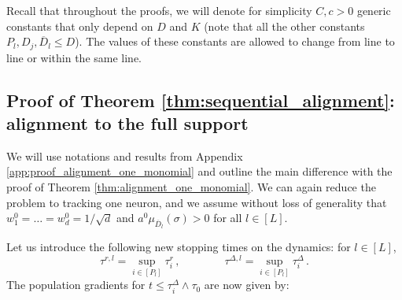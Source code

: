 \documentclass[11pt]{article}
\newcommand{\<}{\langle}
\renewcommand{\>}{\rangle}
\theoremstyle{definition}
\def\oD{\overline{D}}
\def\oD{\overline{D}}
\begin{document}
Recall that throughout the proofs, we will denote for simplicity $C,c>0$ generic constants that only depend on $D$ and $K$ (note that all the other constants $P_l,D_j,\oD_l \leq D$). The values of these constants are allowed to change from line to line or within the same line.


\subsection{Proof of Theorem \ref{thm:sequential_alignment}: alignment to the full support}\label{app:proof_theorem_2}

We will use notations and results from Appendix \ref{app:proof_alignment_one_monomial} and outline the main difference with the proof of Theorem \ref{thm:alignment_one_monomial}. We can again reduce the problem to tracking one neuron, and we assume without loss of generality that $w_1^0 = \ldots = w_d^0 = 1/\sqrt{d}$ and $a^0 \mu_{\oD_l} (\sigma ) >0$ for all $l \in [L]$. 

Let us introduce the following new stopping times on the dynamics: for $l\in [L]$,
\[
\tau^{r,l} = \sup_{i \in [P_l]} \tau_i^r \, , \qquad \qquad  \tau^{\Delta,l} = \sup_{i \in [P_l]} \tau_i^{\Delta} \, .
\]
The population gradients for $t \leq \tau_i^\Delta \wedge \tau_0$ are now given by:
\end{document}

